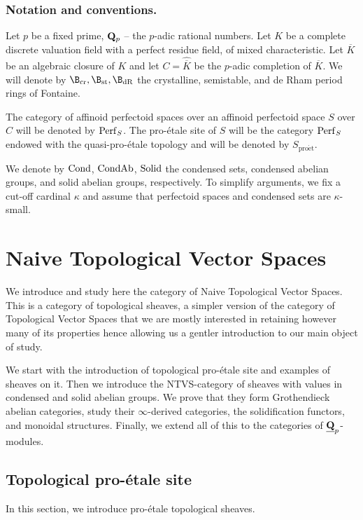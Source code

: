 \documentclass[10pt]{amsart}
\theoremstyle{definition}
\theoremstyle{remark}
\newcommand{\ovk}{\overline{K} }
\newcommand{\dr}{\operatorname{dR} }
\newcommand{\proeet}{\operatorname{pro\acute{e}t} }
\newcommand{\st}{\operatorname{st} }
\newcommand{\crr}{\operatorname{cr} }
\newcommand{\wh}{\widehat}
\numberwithin{equation}{section}
\def\Q{{\bf Q}} \def\Z{{\bf Z}}
\numberwithin{equation}{section}
\begin{document}
 \subsubsection*{Notation and conventions.}\label{Notation} Let $p$ be a fixed prime, $\Q_p$ -- the $p$-adic rational numbers. 
 Let $K$ be a complete discrete valuation field with a perfect residue field, of mixed characteristic. Let $\ovk$ be an algebraic closure of $K$ and let $C=\wh{\ovk}$ be the $p$-adic completion of $\ovk$.  
We will denote by $ \B_{\crr}, \B_{\st},\B_{\dr}$ the crystalline, semistable, and  de Rham period rings of Fontaine. 

 The category of affinoid perfectoid spaces over an affinoid perfectoid space $S$ over $C$ will be denoted by  ${\rm Perf}_S$. The pro-\'etale site of $S$ will be  the category  ${\rm Perf}_S$ endowed with the quasi-pro-\'etale topology and will be denoted by $S_{\proeet}$.   

   We denote by  ${\rm Cond}$, ${\rm CondAb}$, ${\rm Solid}$ the condensed sets, condensed abelian groups, and solid abelian groups, respectively. To simplify arguments, we fix a cut-off cardinal $\kappa$ and assume that  perfectoid spaces and condensed sets are $\kappa$-small. 
 
   
\section{Naive Topological Vector Spaces}\label{naive1}  We introduce and study here the category of Naive Topological Vector Spaces. This is a category of topological sheaves, a simpler version of the category of Topological Vector Spaces that we are mostly interested in retaining however many of its properties hence allowing us a gentler introduction to our main object of study. 

   We start with the  introduction of topological pro-\'etale site and examples of sheaves on it. Then we introduce the {\rm NTVS}-category of sheaves with values in condensed and solid abelian groups. We prove that they form Grothendieck abelian categories, study their $\infty$-derived categories, the solidification functors, and monoidal structures. Finally, we extend all of this to the categories of $\underline{\Q}_p$-modules.
\subsection{Topological pro-\'etale site}\label{defnaive} In this section, we introduce  pro-\'etale topological sheaves. 
\end{document}
